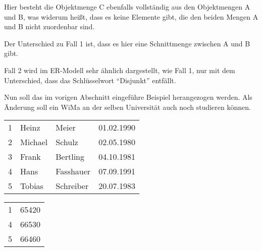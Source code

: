 \begin{center}
\end{center}
Hier besteht die Objektmenge C ebenfalls vollständig aus den Objektmengen A und B, was widerum heiß{}t, dass es keine Elemente gibt, die den beiden Mengen A und B nicht zuordenbar sind.

Der Unterschied zu Fall 1 ist, dass es hier eine Schnittmenge zwischen A und B gibt.

Fall 2 wird im ER-Modell sehr ähnlich dargestellt, wie Fall 1, nur mit dem Unterschied, dass das Schlüsselwort \enquote{Disjunkt} entfällt.
\begin{center}
\end{center}

Nun soll das im vorigen Abschnitt eingeführe Beispiel herangezogen werden. Als Änderung soll ein WiMa an der selben Universität auch noch studieren können.
\vfil
{}
\begin{supertabular}[h]{llll}
    1 & Heinz & Meier & 01.02.1990 \\
    2 & Michael & Schulz & 02.05.1980 \\
    3 & Frank & Bertling & 04.10.1981 \\
    4 & Hans & Fasshauer & 07.09.1991 \\
    5 & Tobias & Schreiber & 20.07.1983 \\
\end{supertabular}
\vfil
{}
\clearpage
{}
\begin{supertabular}[h]{lp{5cm}}
    1 & 65420\\
    4 & 66530\\
    5 & 66460\\
\end{supertabular}

